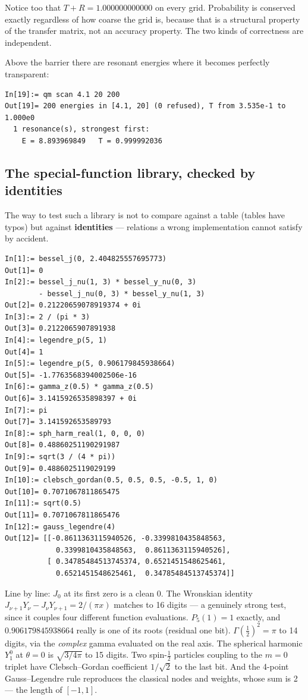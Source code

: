 \documentclass[11pt]{article}
\begin{document}
Notice too that $T + R = 1.000000000000$ on every grid. Probability is
conserved exactly regardless of how coarse the grid is, because that is
a structural property of the transfer matrix, not an accuracy property.
The two kinds of correctness are independent.

Above the barrier there are resonant energies where it becomes
perfectly transparent:

\begin{lstlisting}
In[19]:= qm scan 4.1 20 200
Out[19]= 200 energies in [4.1, 20] (0 refused), T from 3.535e-1 to 1.000e0
  1 resonance(s), strongest first:
    E = 8.893969849   T = 0.999992036
\end{lstlisting}

\subsection{The special-function library, checked by identities}

The way to test such a library is not to compare against a table (tables
have typos) but against \textbf{identities} --- relations a wrong
implementation cannot satisfy by accident.

\begin{lstlisting}
In[1]:= bessel_j(0, 2.404825557695773)
Out[1]= 0
In[2]:= bessel_j_nu(1, 3) * bessel_y_nu(0, 3)
        - bessel_j_nu(0, 3) * bessel_y_nu(1, 3)
Out[2]= 0.21220659078919374 + 0i
In[3]:= 2 / (pi * 3)
Out[3]= 0.2122065907891938
In[4]:= legendre_p(5, 1)
Out[4]= 1
In[5]:= legendre_p(5, 0.906179845938664)
Out[5]= -1.7763568394002506e-16
In[6]:= gamma_z(0.5) * gamma_z(0.5)
Out[6]= 3.1415926535898397 + 0i
In[7]:= pi
Out[7]= 3.141592653589793
In[8]:= sph_harm_real(1, 0, 0, 0)
Out[8]= 0.48860251190291987
In[9]:= sqrt(3 / (4 * pi))
Out[9]= 0.4886025119029199
In[10]:= clebsch_gordan(0.5, 0.5, 0.5, -0.5, 1, 0)
Out[10]= 0.7071067811865475
In[11]:= sqrt(0.5)
Out[11]= 0.7071067811865476
In[12]:= gauss_legendre(4)
Out[12]= [[-0.8611363115940526, -0.3399810435848563,
            0.3399810435848563,  0.8611363115940526],
          [ 0.34785484513745374, 0.6521451548625461,
            0.6521451548625461,  0.34785484513745374]]
\end{lstlisting}

Line by line: $J_0$ at its first zero is a clean 0. The Wronskian
identity $J_{\nu+1}Y_\nu - J_\nu Y_{\nu+1} = 2/(\pi x)$ matches to 16
digits --- a genuinely strong test, since it couples four different
function evaluations. $P_5(1)=1$ exactly, and $0.906179845938664$ really
is one of its roots (residual one bit). $\Gamma(\tfrac12)^2 = \pi$ to 14
digits, via the \emph{complex} gamma evaluated on the real axis. The
spherical harmonic $Y_1^0$ at $\theta=0$ is $\sqrt{3/4\pi}$ to 15
digits. Two spin-$\tfrac12$ particles coupling to the $m=0$ triplet have
Clebsch--Gordan coefficient $1/\sqrt2$ to the last bit. And the 4-point
Gauss--Legendre rule reproduces the classical nodes and weights, whose
sum is 2 --- the length of $[-1,1]$.
\end{document}
